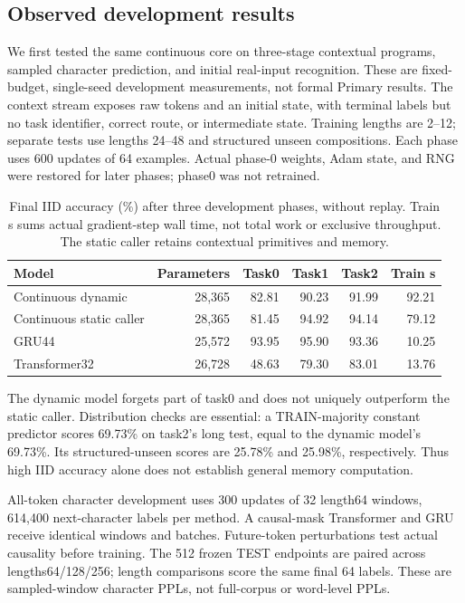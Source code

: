 \subsection{Observed development results}

We first tested the same continuous core on three-stage contextual programs,
sampled character prediction, and initial real-input recognition. These are
fixed-budget, single-seed development measurements, not formal Primary results.
The context stream exposes raw tokens and an initial state, with terminal labels
but no task identifier, correct route, or intermediate state. Training lengths
are 2--12; separate tests use lengths 24--48 and structured unseen compositions.
Each phase uses 600 updates of 64 examples. Actual phase-0 weights, Adam state,
and RNG were restored for later phases; phase0 was not retrained.

\begin{table}[t]
\centering\small
\begin{tabular}{lrrrrr}
\toprule
Model & Parameters & Task0 & Task1 & Task2 & Train s\\
\midrule
Continuous dynamic &28,365&82.81&90.23&91.99&92.21\\
Continuous static caller &28,365&81.45&94.92&94.14&79.12\\
GRU44 &25,572&93.95&95.90&93.36&10.25\\
Transformer32 &26,728&48.63&79.30&83.01&13.76\\
\bottomrule
\end{tabular}
\caption{Final IID accuracy (\%) after three development phases, without
replay. Train s sums actual gradient-step wall time, not total work or exclusive
throughput. The static caller retains contextual primitives and memory.}
\label{tab:development-context}
\end{table}

The dynamic model forgets part of task0 and does not uniquely outperform the
static caller. Distribution checks are essential: a TRAIN-majority constant
predictor scores 69.73\% on task2's long test, equal to the dynamic model's
69.73\%. Its structured-unseen scores are 25.78\% and 25.98\%, respectively.
Thus high IID accuracy alone does not establish general memory computation.

All-token character development uses 300 updates of 32 length64 windows,
614,400 next-character labels per method. A causal-mask Transformer and GRU
receive identical windows and batches. Future-token perturbations test actual
causality before training. The 512 frozen TEST endpoints are paired across
lengths64/128/256; length comparisons score the same final 64 labels. These are
sampled-window character PPLs, not full-corpus or word-level PPLs.

